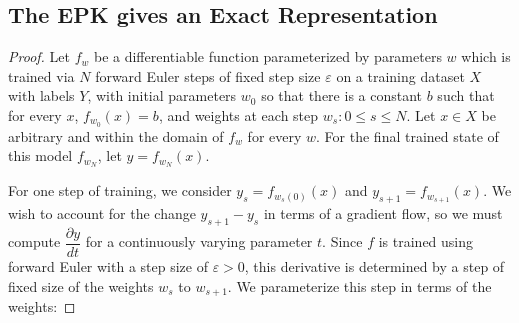 \subsection{The EPK gives an Exact Representation}
\label{proof:eker}
\eker*
\begin{proof}


Let $f_{w}$ be a differentiable function parameterized by parameters $w$ which is trained via $N$ forward Euler steps of fixed step size $\varepsilon$ on a training dataset $X$ with labels $ Y$, with initial parameters $w_0$ so that there is a constant $b$ such that for every $x$, $f_{w_0}(x) = b$, and weights at each step ${w_s : 0 \leq s \leq N}$. Let $x \in X$ be arbitrary and within the domain of $f_w$ for every $w$. For the final trained state of this model $f_{w_N}$, let $y = f_{w_N}(x)$. 

For one step of training, we consider $y_s  = f_{w_s(0)}(x)$ and $y_{s+1} = f_{w_{s+1}}(x)$. We wish to account for the change $y_{s+1} - y_s$ in terms of a gradient flow, so we must compute $\dfrac{\partial y}{dt}$ for a continuously varying parameter $t$. Since $f$ is trained using forward Euler with a step size of $\varepsilon > 0$, this derivative is determined by a step of fixed size of the weights $w_s$ to $w_{s+1}$. We parameterize this step in terms of the weights:


\end{proof}
